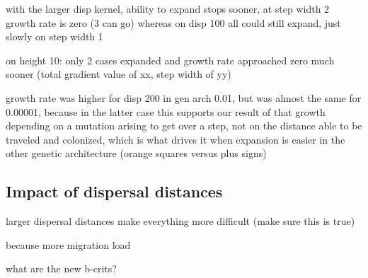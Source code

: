 with the larger disp kernel, ability to expand stops sooner, at step width 2 growth rate is zero (3 can go) whereas on disp 100 all could still expand, just slowly on step width 1


on height 10:
only 2 cases expanded and growth rate approached zero much sooner (total gradient value of xx, step width of yy)

growth rate was higher for disp 200 in gen arch 0.01, but was almost the same for 0.00001, because in the latter case this supports our result of that growth depending on a mutation arising to get over a step, not on the distance able to be traveled and colonized, which is what drives it when expansion is easier in the other genetic architecture (orange squares versus plus signs)



\subsection{Impact of dispersal distances}

larger dispersal distances make everything more difficult (make sure this is true)

because more migration load

what are the new b-crits?



